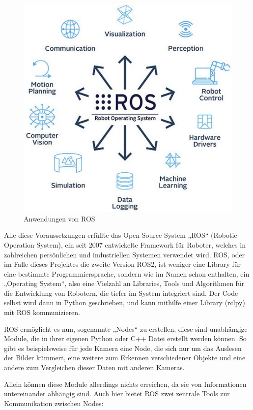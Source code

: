 \documentclass[12pt, ngerman]{article}
\begin{document}
\begin{figure}
\centering
  \includegraphics[angle=0,width=\linewidth]{ROS_diagram.jpg}
  \caption{Anwendungen von ROS}
\end{figure}
Alle diese Voraussetzungen erfüllte das Open-Source System „ROS“ (Robotic Operation System), ein seit 2007 entwickelte Framework für Roboter, welches in zahlreichen persönlichen und industriellen Systemen verwendet wird. ROS, oder im Falle dieses Projektes die zweite Version ROS2, ist weniger eine Library für eine bestimmte Programmiersprache, sondern wie im Namen schon enthalten, ein „Operating System“, also eine Vielzahl an Libraries, Tools und Algorithmen für die Entwicklung von Robotern, die tiefer im System integriert sind. Der Code selbst wird dann in Python geschrieben, und kann mithilfe einer Library (rclpy) mit ROS kommunizieren. 

ROS ermöglicht es nun, sogenannte „Nodes“ zu erstellen, diese sind unabhängige Module, die in ihrer eigenen Python oder C++ Datei erstellt werden können. So gibt es beispielsweise für jede Kamera eine Node, die sich nur um das Auslesen der Bilder kümmert, eine weitere zum Erkennen verschiedener Objekte und eine andere zum Vergleichen dieser Daten mit anderen Kameras.  

Allein können diese Module allerdings nichts erreichen, da sie von Informationen untereinander abhängig sind. Auch hier bietet ROS zwei zentrale Tools zur Kommunikation zwischen Nodes:  
\end{document}
